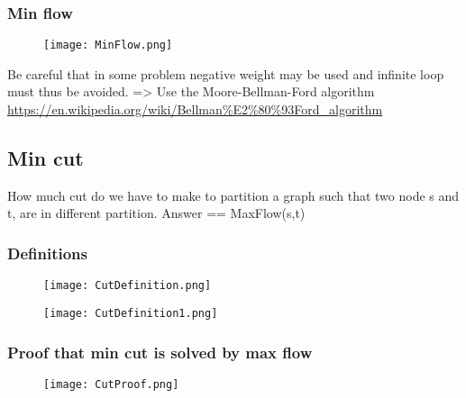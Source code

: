 \subsubsection{Min flow}

\begin{figure}[!ht]
    \centering
    \texttt{[image: MinFlow.png]}
\end{figure}

Be careful that in some problem negative weight may be used and infinite loop must thus be avoided. => Use the Moore-Bellman-Ford algorithm \url{https://en.wikipedia.org/wiki/Bellman%E2%80%93Ford_algorithm} 

\subsection{Min cut}

How much cut do we have to make to partition a graph such that two node s and t, are in different partition. Answer == MaxFlow(s,t)

\subsubsection{Definitions}

\begin{figure}[!ht]
    \centering
    \texttt{[image: CutDefinition.png]}
\end{figure}
\FloatBarrier

\begin{figure}[!ht]
    \centering
    \texttt{[image: CutDefinition1.png]}
\end{figure}
\FloatBarrier

\subsubsection{Proof that min cut is solved by max flow}

\begin{figure}[!ht]
    \centering
    \texttt{[image: CutProof.png]}
\end{figure}
\FloatBarrier